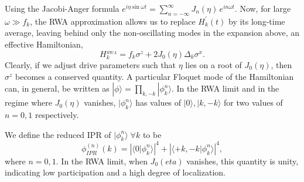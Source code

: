 \documentclass[%
 reprint,
 amsmath,amssymb,
 aps,
]{revtex4-2}
\begin{document}
Using the Jacobi-Anger formula $e^{i \eta \sin{\omega t}} = \sum_{n=-\infty}^{\infty} J_n(\eta)\, e^{i n \omega t}$. Now, for large $\omega \gg f_k$, the RWA approximation allows us to replace $H^\prime_k(t)$ by its long-time average, leaving behind only the non-oscillating modes in the expansion above, an effective Hamiltonian,
\begin{equation}
	H^{_{RWA}}_k=f_k \sigma^z + 2 J_0(\eta)\Delta_k\sigma^x.
\end{equation}
Clearly, if we adjust drive parameters such that $\eta$ lies on a root of $J_0(\eta)$, then $\sigma^z$ becomes a conserved quantity. A particular Floquet mode of the Hamiltonian can, in general, be written as $|\phi\rangle = \prod_{k,-k}|\phi^n_k\rangle$. In the RWA limit and in the regime where $J_0(\eta)$ vanishes, $|\phi^n_k\rangle$ has values of $|0\rangle, |k,-k\rangle$ for two values of $n=0,1$ respectively.

We define the reduced IPR of $|\phi^n_k\rangle\; \forall k$ to be
\begin{equation}
	\label{eq:ipr:ising}
	\phi^{(n)}_{IPR}(k) = \left\vert \langle 0 |\phi^n_k\rangle  \right\vert^4 + \left\vert \langle +k, -k |\phi^n_k\rangle  \right\vert^4,
\end{equation}
where $n=0,1$. In the RWA limit, when $J_0(eta)$ vanishes, this quantity is unity, indicating low participation and a high degree of localization.
\end{document}
